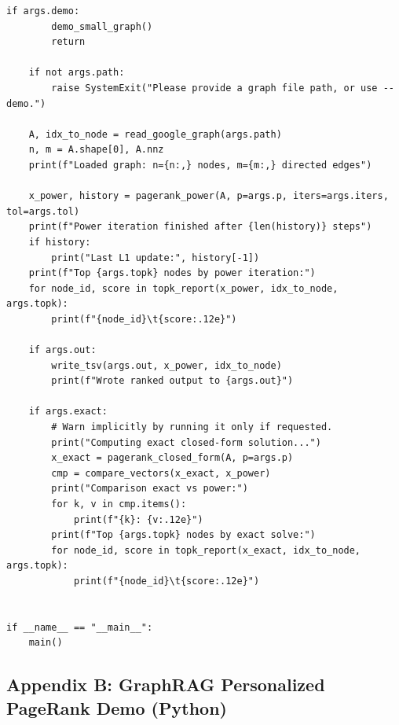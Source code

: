 \documentclass[12pt]{article}
\begin{document}
\begin{lstlisting}[style=pythonstyle]
    if args.demo:
        demo_small_graph()
        return

    if not args.path:
        raise SystemExit("Please provide a graph file path, or use --demo.")

    A, idx_to_node = read_google_graph(args.path)
    n, m = A.shape[0], A.nnz
    print(f"Loaded graph: n={n:,} nodes, m={m:,} directed edges")

    x_power, history = pagerank_power(A, p=args.p, iters=args.iters, tol=args.tol)
    print(f"Power iteration finished after {len(history)} steps")
    if history:
        print("Last L1 update:", history[-1])
    print(f"Top {args.topk} nodes by power iteration:")
    for node_id, score in topk_report(x_power, idx_to_node, args.topk):
        print(f"{node_id}\t{score:.12e}")

    if args.out:
        write_tsv(args.out, x_power, idx_to_node)
        print(f"Wrote ranked output to {args.out}")

    if args.exact:
        # Warn implicitly by running it only if requested.
        print("Computing exact closed-form solution...")
        x_exact = pagerank_closed_form(A, p=args.p)
        cmp = compare_vectors(x_exact, x_power)
        print("Comparison exact vs power:")
        for k, v in cmp.items():
            print(f"{k}: {v:.12e}")
        print(f"Top {args.topk} nodes by exact solve:")
        for node_id, score in topk_report(x_exact, idx_to_node, args.topk):
            print(f"{node_id}\t{score:.12e}")


if __name__ == "__main__":
    main()

\end{lstlisting}

\subsection{Appendix B: GraphRAG Personalized PageRank Demo (Python)}
\end{document}
